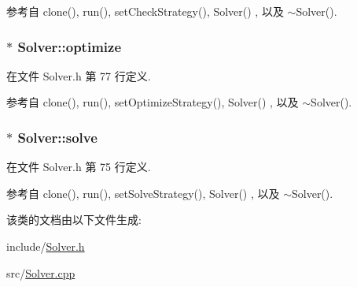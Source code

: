 参考自 clone(), run(), set\+Check\+Strategy(), Solver() , 以及 $\sim$\+Solver().

\subsubsection[{\texorpdfstring{optimize}{optimize}}]{$\ast$ Solver\+::optimize\hspace{0.3cm}{\ttfamily [private]}}\hypertarget{classSolver_a030d66f9899352a9c96313801ae58b8a}{}\label{classSolver_a030d66f9899352a9c96313801ae58b8a}


在文件 Solver.\+h 第 77 行定义.



参考自 clone(), run(), set\+Optimize\+Strategy(), Solver() , 以及 $\sim$\+Solver().

\subsubsection[{\texorpdfstring{solve}{solve}}]{$\ast$ Solver\+::solve\hspace{0.3cm}{\ttfamily [private]}}\hypertarget{classSolver_a2da9746bdd69a8ae76bb519bb1bc95b3}{}\label{classSolver_a2da9746bdd69a8ae76bb519bb1bc95b3}


在文件 Solver.\+h 第 75 行定义.



参考自 clone(), run(), set\+Solve\+Strategy(), Solver() , 以及 $\sim$\+Solver().



该类的文档由以下文件生成\+:\begin{DoxyCompactItemize}
\item 
include/\hyperlink{Solver_8h}{Solver.\+h}\item 
src/\hyperlink{Solver_8cpp}{Solver.\+cpp}\end{DoxyCompactItemize}
